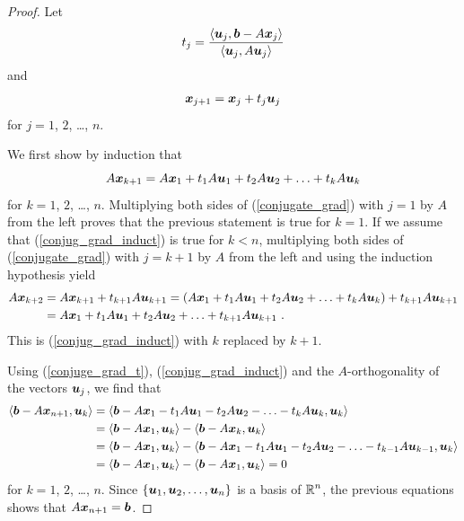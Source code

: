 \begin{proof}
Let
\begin{equation}\label{conjuge_grad_t}
t_j =
\frac{\left\langle{\bm{u}_j} , {\bm{b} - A\bm{x}_j}\right\rangle}{\left\langle{\bm{u}_j} , {A\bm{u}_j}\right\rangle}
\end{equation}
and
\begin{equation}\label{conjugate_grad}
\bm{x}_{j+1} = \bm{x}_j + t_j \bm{u}_j
\end{equation}
for $j=1$, $2$, \ldots, $n$.

We first show by induction that
\begin{equation}\label{conjug_grad_induct}
A\bm{x}_{k+1} = A\bm{x}_1 + t_1 A\bm{u}_1 + t_2 A\bm{u}_2 +
\ldots + t_k A\bm{u}_k
\end{equation}
for $k=1$, $2$, \ldots, $n$.
Multiplying both sides of (\ref{conjugate_grad}) with $j=1$ by $A$
from the left proves that the previous statement is true for $k=1$.
If we assume that (\ref{conjug_grad_induct}) is true for $k < n$,
multiplying both sides of (\ref{conjugate_grad}) with $j=k+1$ by $A$
from the left and using the induction hypothesis yield
\begin{align*}
A\bm{x}_{k+2} &= A\bm{x}_{k+1} + t_{k+1} A\bm{u}_{k+1}
= \left( A\bm{x}_1 + t_1 A\bm{u}_1 + t_2 A\bm{u}_2 +
\ldots + t_k A\bm{u}_k \right) + t_{k+1} A\bm{u}_{k+1} \\
&= A\bm{x}_1 + t_1 A\bm{u}_1 + t_2 A\bm{u}_2 +
\ldots + t_{k+1} A\bm{u}_{k+1} \ .
\end{align*}
This is (\ref{conjug_grad_induct}) with $k$ replaced by $k+1$.

Using (\ref{conjuge_grad_t}), (\ref{conjug_grad_induct}) and the
$A$-orthogonality of the vectors $\bm{u}_j$, we find that
\begin{align*}
\left\langle{\bm{b} - A \bm{x}_{n+1}} , {\bm{u}_k}\right\rangle &=
\left\langle{\bm{b} - A\bm{x}_1 - t_1 A\bm{u}_1 - t_2 A\bm{u}_2 -
\ldots - t_k A\bm{u}_k} , {\bm{u}_k}\right\rangle \\
&= \left\langle{\bm{b} - A\bm{x}_1} , {\bm{u}_k}\right\rangle
- \left\langle{\bm{b}- A\bm{x}_k} , {\bm{u}_k}\right\rangle \\
&= \left\langle{\bm{b} - A\bm{x}_1} , {\bm{u}_k}\right\rangle -
\left\langle{\bm{b} - A\bm{x}_1 - t_1 A\bm{u}_1 - t_2 A\bm{u}_2 -
\ldots - t_{k-1} A\bm{u}_{k-1}} , {\bm{u}_k}\right\rangle \\
&= \left\langle{\bm{b} - A\bm{x}_1} , {\bm{u}_k}\right\rangle - \left\langle{\bm{b} - A\bm{x}_1} , {\bm{u}_k}\right\rangle
= 0
\end{align*}
for $k=1$, $2$, \ldots, $n$.  Since
$\{\bm{u}_1, \bm{u}_2, \ldots, \bm{u}_n\}$ is a basis of
$\displaystyle \mathbb{R}^n$, the previous equations shows that
$A \bm{x}_{n+1} = \bm{b}$.
\end{proof}

